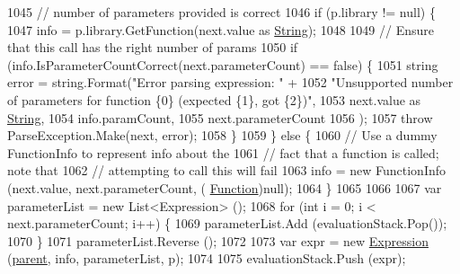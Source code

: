 \begin{DoxyCode}
1045                         \textcolor{comment}{// number of parameters provided is correct}
1046                         \textcolor{keywordflow}{if} (p.library != null) \{
1047                             info = p.library.GetFunction(next.value as \hyperlink{a00029_a301aa7c866593a5b625a8fc158bbeacea27118326006d3829667a400ad23d5d98}{String});
1048 
1049                             \textcolor{comment}{// Ensure that this call has the right number of params}
1050                             \textcolor{keywordflow}{if} (info.IsParameterCountCorrect(next.parameterCount) == \textcolor{keyword}{false}) \{
1051                                 \textcolor{keywordtype}{string} error = string.Format(\textcolor{stringliteral}{"Error parsing expression: "} +
1052                                     \textcolor{stringliteral}{"Unsupported number of parameters for function \{0\} (expected \{1\}, got
       \{2\})"},
1053                                     next.value as \hyperlink{a00029_a301aa7c866593a5b625a8fc158bbeacea27118326006d3829667a400ad23d5d98}{String},
1054                                     info.paramCount,
1055                                     next.parameterCount
1056                                 );
1057                                 \textcolor{keywordflow}{throw} ParseException.Make(next, error);
1058                             \}
1059                         \} \textcolor{keywordflow}{else} \{
1060                             \textcolor{comment}{// Use a dummy FunctionInfo to represent info about the}
1061                             \textcolor{comment}{// fact that a function is called; note that}
1062                             \textcolor{comment}{// attempting to call this will fail}
1063                             info = \textcolor{keyword}{new} FunctionInfo (next.value, next.parameterCount, (
      \hyperlink{a00029_ae0be2e5cf13d5779816102439e61ff1a}{Function})null);
1064                         \}
1065 
1066 
1067                         var parameterList = \textcolor{keyword}{new} List<Expression> ();
1068                         \textcolor{keywordflow}{for} (\textcolor{keywordtype}{int} i = 0; i < next.parameterCount; i++) \{
1069                             parameterList.Add (evaluationStack.Pop());
1070                         \}
1071                         parameterList.Reverse ();
1072 
1073                         var expr = \textcolor{keyword}{new} \hyperlink{a00080_a17e5101d02b96d0071e7a0223e4daa3d}{Expression} (\hyperlink{a00120_af313a82103fcc2ff5a177dbb06b92f7b}{parent}, info, parameterList, p);
1074 
1075                         evaluationStack.Push (expr);

\end{DoxyCode}
